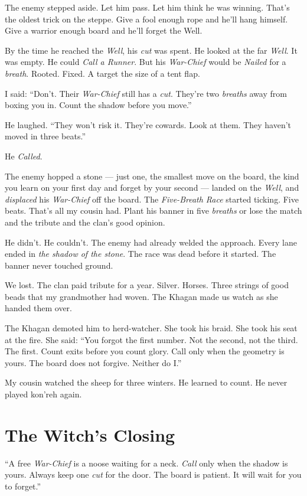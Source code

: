 The enemy stepped aside. Let him pass. Let him think he was winning. That's the oldest trick on the steppe. Give a fool enough rope and he'll hang himself. Give a warrior enough board and he'll forget the Well.

By the time he reached the \textit{Well}, his \textit{cut} was spent. He looked at the far \textit{Well}. It was empty. He could \textit{Call a Runner}. But his \textit{War-Chief} would be \textit{Nailed} for a \textit{breath}. Rooted. Fixed. A target the size of a tent flap.

I said: ``Don't. Their \textit{War-Chief} still has a \textit{cut}. They're two \textit{breaths} away from boxing you in. Count the shadow before you move.''

He laughed. ``They won't risk it. They're cowards. Look at them. They haven't moved in three beats.''

He \textit{Called}.

The enemy hopped a stone --- just one, the smallest move on the board, the kind you learn on your first day and forget by your second --- landed on the \textit{Well}, and \textit{displaced} his \textit{War-Chief} off the board. The \textit{Five-Breath Race} started ticking. Five beats. That's all my cousin had. Plant his banner in five \textit{breaths} or lose the match and the tribute and the clan's good opinion.

He didn't. He couldn't. The enemy had already welded the approach. Every lane ended in \textit{the shadow of the stone}. The race was dead before it started. The banner never touched ground.

We lost. The clan paid tribute for a year. Silver. Horses. Three strings of good beads that my grandmother had woven. The Khagan made us watch as she handed them over.

The Khagan demoted him to herd-watcher. She took his braid. She took his seat at the fire. She said: ``You forgot the first number. Not the second, not the third. The first. Count exits before you count glory. Call only when the geometry is yours. The board does not forgive. Neither do I.''

My cousin watched the sheep for three winters. He learned to count. He never played kon'reh again.

\section*{The Witch's Closing}

``A free \textit{War-Chief} is a noose waiting for a neck. \textit{Call} only when the shadow is yours. Always keep one \textit{cut} for the door. The board is patient. It will wait for you to forget.''

